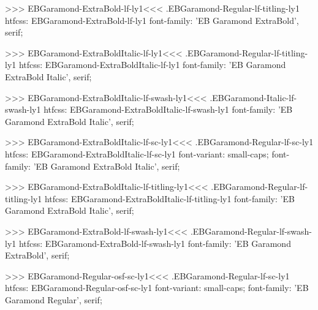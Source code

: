 {{>>>
\<EBGaramond-ExtraBold-lf-ly1\><<<
.EBGaramond-Regular-lf-titling-ly1
htfcss:  EBGaramond-ExtraBold-lf-ly1  font-family: 'EB Garamond ExtraBold', serif;

>>>
\<EBGaramond-ExtraBoldItalic-lf-ly1\><<<
.EBGaramond-Regular-lf-titling-ly1
htfcss:  EBGaramond-ExtraBoldItalic-lf-ly1  font-family: 'EB Garamond ExtraBold Italic', serif;

>>>
\<EBGaramond-ExtraBoldItalic-lf-swash-ly1\><<<
.EBGaramond-Italic-lf-swash-ly1
htfcss:  EBGaramond-ExtraBoldItalic-lf-swash-ly1  font-family: 'EB Garamond ExtraBold Italic', serif;

>>>
\<EBGaramond-ExtraBoldItalic-lf-sc-ly1\><<<
.EBGaramond-Regular-lf-sc-ly1
htfcss:  EBGaramond-ExtraBoldItalic-lf-sc-ly1  font-variant: small-caps; font-family: 'EB Garamond ExtraBold Italic', serif;

>>>
\<EBGaramond-ExtraBoldItalic-lf-titling-ly1\><<<
.EBGaramond-Regular-lf-titling-ly1
htfcss:  EBGaramond-ExtraBoldItalic-lf-titling-ly1  font-family: 'EB Garamond ExtraBold Italic', serif;

>>>
\<EBGaramond-ExtraBold-lf-swash-ly1\><<<
.EBGaramond-Regular-lf-swash-ly1
htfcss:  EBGaramond-ExtraBold-lf-swash-ly1  font-family: 'EB Garamond ExtraBold', serif;

>>>
\<EBGaramond-Regular-osf-sc-ly1\><<<
.EBGaramond-Regular-lf-sc-ly1
htfcss:  EBGaramond-Regular-osf-sc-ly1  font-variant: small-caps; font-family: 'EB Garamond Regular', serif;

}}
